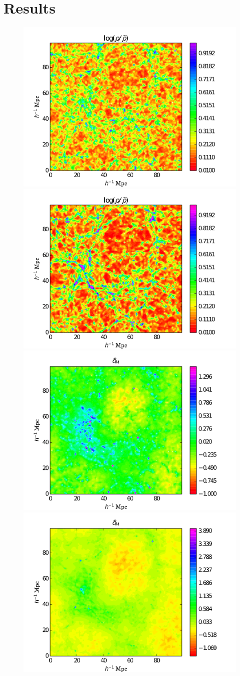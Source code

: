\documentclass[twocolumns]{emulateapj}
\begin{document}
{\section{Results}
\begin{figure}
  \centering
\includegraphics[width = .45\textwidth ]{data_rho_z3_qso4.png}
\includegraphics[width = .45\textwidth ]{data_rho_z1_qso4.png}
\includegraphics[width = .45\textwidth ]{data_delta_z3_gal2.png}
\includegraphics[width = .45\textwidth ]{data_delta_z1_gal2.png}


\end{figure}}
\end{document}
